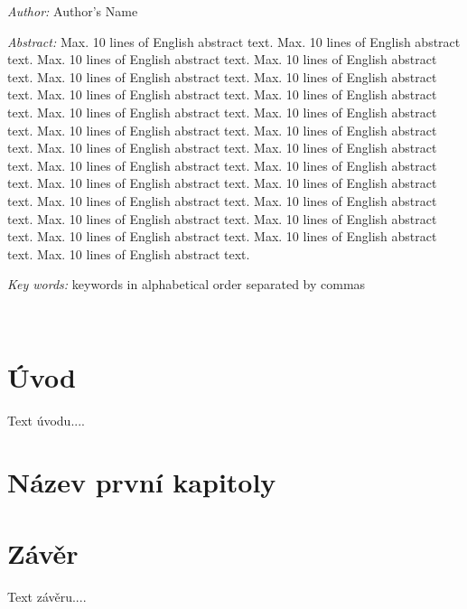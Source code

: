 \documentclass[a4paper,11pt]{book}
\begin{document}
\bigskip{}


\noindent \emph{Author:} Author's Name

\bigskip{}


\noindent \emph{Abstract:} Max. 10 lines of English abstract text.
Max. 10 lines of English abstract text. Max. 10 lines of English abstract
text. Max. 10 lines of English abstract text. Max. 10 lines of English
abstract text. Max. 10 lines of English abstract text. Max. 10 lines
of English abstract text. Max. 10 lines of English abstract text.
Max. 10 lines of English abstract text. Max. 10 lines of English abstract
text. Max. 10 lines of English abstract text. Max. 10 lines of English
abstract text. Max. 10 lines of English abstract text. Max. 10 lines
of English abstract text. Max. 10 lines of English abstract text.
Max. 10 lines of English abstract text. Max. 10 lines \cite{Allen-Cahn} of English abstract
text. Max. 10 lines of English abstract text. Max. 10 lines of English
abstract text. Max. 10 lines of English abstract text. Max. 10 lines
of English abstract text. Max. 10 lines of English abstract text.
Max. 10 lines of English abstract text. Max. 10 lines of English abstract
text. Max. 10 lines of English abstract text.

\bigskip{}


\noindent \emph{Key words:} keywords in alphabetical order separated
by commas

\newpage{}

~\newpage{}

\pagestyle{plain}

\tableofcontents{}

\newpage{}


\chapter*{Úvod}


Text úvodu....


\chapter{Název první kapitoly}

\pagestyle{headings}


\chapter*{Závěr}

\pagestyle{plain}


Text závěru....
\nocite{*}
\printbibliography[title=Literatura]
\end{document}
